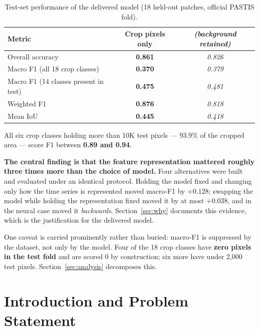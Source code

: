 \documentclass[11pt,a4paper]{article}
\newcommand{\bestval}[1]{\textbf{#1}}          %
\begin{document}
\begin{table}[htbp]
\centering
\caption{Test-set performance of the delivered model (18 held-out patches,
official PASTIS fold).}
\label{tab:headline}
\begin{tabular}{lcc}
\toprule
\textbf{Metric} & \textbf{Crop pixels only} & \textit{(background retained)} \\
\midrule
Overall accuracy                       & \bestval{0.861} & \textit{0.826} \\
Macro F1 (all 18 crop classes)         & \bestval{0.370} & \textit{0.379} \\
Macro F1 (14 classes present in test)  & \bestval{0.475} & \textit{0.481} \\
Weighted F1                            & \bestval{0.876} & \textit{0.818} \\
Mean IoU                               & \bestval{0.445} & \textit{0.418} \\
\bottomrule
\end{tabular}
\end{table}

All six crop classes holding more than 10K test pixels --- 93.9\% of the
cropped area --- score F1 between \textbf{0.89 and 0.94}.

\textbf{The central finding is that the feature representation mattered roughly
three times more than the choice of model.} Four alternatives were built and
evaluated under an identical protocol. Holding the model fixed and changing only
how the time series is represented moved macro-F1 by \textbf{$+0.128$}; swapping
the model while holding the representation fixed moved it by at most
\textbf{$+0.038$}, and in the neural case moved it \emph{backwards}.
Section~\ref{sec:why} documents this evidence, which is the justification for
the delivered model.

One caveat is carried prominently rather than buried: macro-F1 is suppressed by
the dataset, not only by the model. Four of the 18 crop classes have \textbf{zero
pixels in the test fold} and are scored 0 by construction; six more have under
2{,}000 test pixels. Section~\ref{sec:analysis} decomposes this.

\section{Introduction and Problem Statement}\label{sec:intro}
\end{document}
